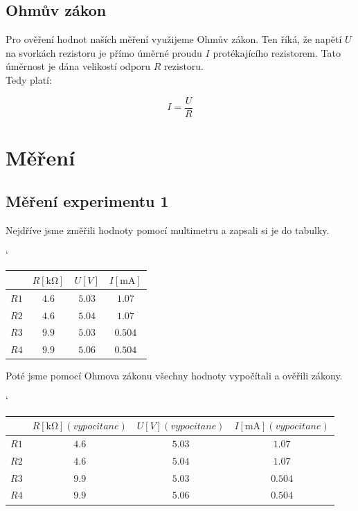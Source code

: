 \documentclass[11pt,a4paper,titlepage]{article}
\begin{document}
\subsection{Ohmův zákon}

Pro ověření hodnot naších měření využijeme Ohmův zákon. Ten říká, že napětí $U$ na svorkách rezistoru je přímo úměrné proudu $I$ protékajícího rezistorem. Tato úměrnost je dána velikostí odporu $R$ rezistoru. 
\\ Tedy platí:

\begin{equation}
I=\frac{U}{R}
 \label{eq:ohms_law}
\end{equation}

\section{Měření}

\subsection{Měření experimentu 1}

Nejdříve jsme změřili hodnoty pomocí multimetru a zapsali si je do tabulky.

\begin{table}[h]
\begin{center}
\catcode`
\begin{tabular}{|c|c|c|c|} \hline
  & $R [\si{\kilo\ohm}]$ & $U [V]$ & $I [\si{\milli\ampere}]$\\ \hline
 $R1$ &$4.6$ & $5.03$ & $1.07$  \\ \hline
 $R2$ &$4.6$ & $5.04$ & $1.07$  \\ \hline
 $R3$ &$9.9$ & $5.03$ & $0.504$  \\ \hline
 $R4$ &$9.9$ & $5.06$ & $0.504$  \\ \hline
\end{tabular}
\end{center}
\end{table}

Poté jsme pomocí Ohmova zákonu všechny hodnoty vypočítali a ověřili zákony.

\begin{table}[h]
\begin{center}
\catcode`
\begin{tabular}{|c|c|c|c|} \hline
  & $R [\si{\kilo\ohm}](vypocitane)$  & $U[V](vypocitane)$ & $I [\si{\milli\ampere}](vypocitane)$\\ \hline
 $R1$ &$4.6$ & $5.03$ & $1.07$  \\ \hline
 $R2$ &$4.6$ & $5.04$ & $1.07$  \\ \hline
 $R3$ &$9.9$ & $5.03$ & $0.504$  \\ \hline
 $R4$ &$9.9$ & $5.06$ & $0.504$  \\ \hline
\end{tabular}
\end{center}
\end{table}
\end{document}
